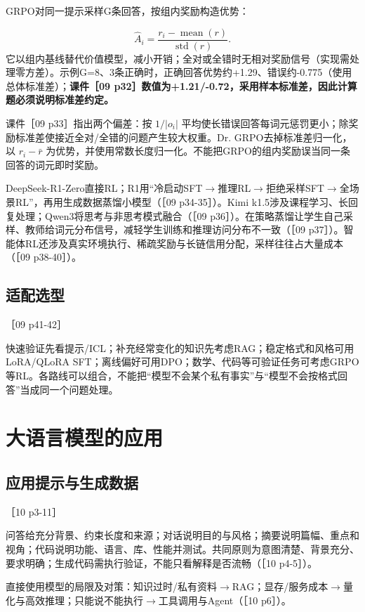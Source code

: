 \documentclass[UTF8,a4paper,zihao=-4,fontset=windows]{ctexart}
\newcommand{\source}[1]{{\small #1}\par}
\begin{document}
GRPO对同一提示采样G条回答，按组内奖励构造优势：

\[\hat A_i=\frac{r_i-\operatorname{mean}(r)}{\operatorname{std}(r)}.\]
它以组内基线替代价值模型，减小开销；全对或全错时无相对奖励信号（实现需处理零方差）。示例G=8、3条正确时，正确回答优势约+1.29、错误约-0.775（使用总体标准差）；\textbf{课件［09 p32］数值为+1.21/\allowbreak{}-0.72，采用样本标准差，因此计算题必须说明标准差约定。}

课件［09 p33］指出两个偏差：按 $1/|o_i|$ 平均使长错误回答每词元惩罚更小；除奖励标准差使接近全对/\allowbreak{}全错的问题产生较大权重。Dr. GRPO去掉标准差归一化，以 $r_i-\bar r$ 为优势，并使用常数长度归一化。不能把GRPO的组内奖励误当同一条回答的词元即时奖励。

DeepSeek-R1-Zero直接RL；R1用“冷启动SFT\ensuremath{\rightarrow}推理RL\ensuremath{\rightarrow}拒绝采样SFT\ensuremath{\rightarrow}全场景RL”，再用生成数据蒸馏小模型（［09 p34-35］）。Kimi k1.5涉及课程学习、长回复处理；Qwen3将思考与非思考模式融合（［09 p36］）。在策略蒸馏让学生自己采样、教师给词元分布信号，减轻学生训练和推理访问分布不一致（［09 p37］）。智能体RL还涉及真实环境执行、稀疏奖励与长链信用分配，采样往往占大量成本（［09 p38-40］）。

\subsection{适配选型}
\source{［09 p41-42］}
快速验证先看提示/\allowbreak{}ICL；补充经常变化的知识先考虑RAG；稳定格式和风格可用LoRA/\allowbreak{}QLoRA SFT；离线偏好可用DPO；数学、代码等可验证任务可考虑GRPO等RL。各路线可以组合，不能把“模型不会某个私有事实”与“模型不会按格式回答”当成同一个问题处理。

\section{大语言模型的应用}
\subsection{应用提示与生成数据}
\source{［10 p3-11］}
问答给充分背景、约束长度和来源；对话说明目的与风格；摘要说明篇幅、重点和视角；代码说明功能、语言、库、性能并测试。共同原则为意图清楚、背景充分、要求明确；生成代码需执行验证，不能只看解释是否流畅（［10 p4-5］）。

直接使用模型的局限及对策：知识过时/\allowbreak{}私有资料\ensuremath{\rightarrow}RAG；显存/\allowbreak{}服务成本\ensuremath{\rightarrow}量化与高效推理；只能说不能执行\ensuremath{\rightarrow}工具调用与Agent（［10 p6］）。
\end{document}
